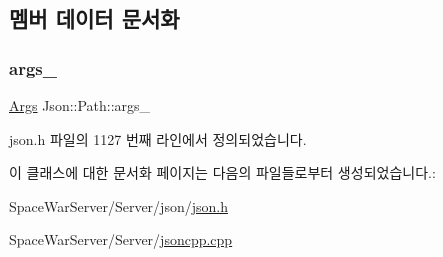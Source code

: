 \subsection{멤버 데이터 문서화}
\mbox{\label{class_json_1_1_path_af33d0de7ee9f99d3e361bdf504dc2bc7}} 
\subsubsection{\texorpdfstring{args\+\_\+}{args\_}}
{\footnotesize\ttfamily \hyperlink{class_json_1_1_path_a27d96232d034d7a78286468676f9cb3e}{Args} Json\+::\+Path\+::args\+\_\+\hspace{0.3cm}{\ttfamily [private]}}



json.\+h 파일의 1127 번째 라인에서 정의되었습니다.



이 클래스에 대한 문서화 페이지는 다음의 파일들로부터 생성되었습니다.\+:\begin{DoxyCompactItemize}
\item 
Space\+War\+Server/\+Server/json/\hyperlink{json_8h}{json.\+h}\item 
Space\+War\+Server/\+Server/\hyperlink{jsoncpp_8cpp}{jsoncpp.\+cpp}\end{DoxyCompactItemize}
